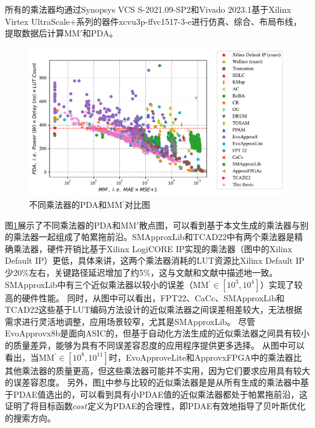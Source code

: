 所有的乘法器均通过Synopsys VCS S-2021.09-SP2和Vivado 2023.1基于Xilinx Virtex UltraScale+系列的器件xcvu3p-ffvc1517-3-e进行仿真、综合、布局布线，提取数据后计算MM$\prime$和PDA。

\begin{figure}[!htbp]
    \centering
    \includegraphics[width=\linewidth]{./figs/AC-AM-FPGA-AMG-PDA_MM_prime.pdf}
    \caption{不同乘法器的PDA和MM$^{\prime}$对比图}
    \label{AC:AM:FPGA:AMG:Fig:PDA_MM_prime}
\end{figure}

图\ref{AC:AM:FPGA:AMG:Fig:PDA_MM_prime}展示了不同乘法器的PDA和MM$\prime$散点图，可以看到基于本文生成的乘法器与别的乘法器一起组成了帕累拖前沿。SMApproxLib和TCAD22中有两个乘法器是精确乘法器，硬件开销比基于Xilinx LogiCORE IP实现的乘法器（图中的Xilinx Default IP）更低，具体来讲，这两个乘法器消耗的LUT资源比Xilinx Default IP少20\%左右，关键路径延迟增加了约5\%，这与文献\cite{AC:AM:FPGA:SMApproxLib}和文献\cite{AC:AM:FPGA:TCAD22}中描述地一致。
SMApproxLib中有三个近似乘法器以较小的误差（MM$^\prime\in[10^3,10^4]$）实现了较高的硬件性能。
同时，从图中可以看出，FPT22、CaCc、SMApproxLib和TCAD22这些基于LUT编码方法设计的近似乘法器之间误差相差较大，无法根据需求进行灵活地调整，应用场景较窄，尤其是SMApproxLib。
尽管EvoApprovx8b\cite{AC:AM:CGP_Evoapprox8b}是面向ASIC的，但基于自动化方法生成的近似乘法器之间具有较小的质量差异，能够为具有不同误差容忍度的应用程序提供更多选择。
从图中可以看出，当MM$^\prime \in [10^8,10^{11}]$时，EvoApproveLite\cite{AC:AM:CGP_EvoLite}和ApprovxFPGA\cite{AC:AM:FPGA:ApproxFPGAs}中的乘法器比其他乘法器的质量更高，但这些乘法器可能并不实用，因为它们要求应用具有较大的误差容忍度。
另外，图\ref{AC:AM:FPGA:AMG:Fig:PDA_MM_prime}中参与比较的近似乘法器是是从所有生成的乘法器中基于PDAE值选出的，可以看到具有小PDAE值的近似乘法器都处于帕累拖前沿，这证明了将目标函数$cost$定义为PDAE的合理性，即PDAE有效地指导了贝叶斯优化的搜索方向。

